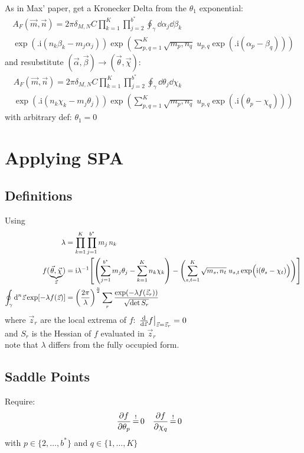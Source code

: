 \documentclass[
	english,
	a4paper,
	fontsize=10pt,
	parskip=half,
	titlepage=true,
	DIV=12,
	final
]{scrreprt}
\newcommand*{\iunit}{\ensuremath{\mathrm{i}}}
\newcommand*{\equalCond}{  \mathop{=}\limits^!  }
\begin{document}
As in Max' paper, get a Kronecker Delta from the $\theta_1$ exponential:
\begin{multline}	
	A_F(\vec{m}, \vec{n})
=
	2\pi \delta_{M,N} C
	\prod_{k=1}^{K}
	\prod_{j=2}^{b^*}
		\oint_{\gamma}
			\dd{\alpha_j} \dd{\beta_k}
\\
	\exp(
		\Big.
		\iunit(
		n_k \beta _k   -
		m_j \alpha_j
	))
	\exp(
		\sum_{p,q=1}^{K}
		\sqrt{m_p, n_q} \;
		u_{p,q}
		\exp(\Big.
			\iunit(\alpha_p - \beta_q)
		)
	)
\end{multline}
and resubstitute $(\vec{\alpha}, \vec{\beta}) \to (\vec{\theta}, \vec{\chi})$:
\begin{multline}	
	A_F(\vec{m}, \vec{n})
=
	2\pi \delta_{M,N} C
	\prod_{k=1}^{K}
	\prod_{j=2}^{b^*}
		\oint_{\gamma}
			\dd{\theta_j} \dd{\chi_k}
\\
	\exp(
		\Big.
		\iunit(
		n_k \chi  _k   -
		m_j \theta_j
	))
	\exp(
		\sum_{p,q=1}^{K}
		\sqrt{m_p, n_q} \;
		u_{p,q}
		\exp(\Big.
			\iunit(\theta_p - \chi_q)
		)
	)
\end{multline}
with arbitrary def: $\theta_1 = 0$

\section{Applying SPA}
\subsection{Definitions}
Using
\begin{align}
	\lambda
&=
	\prod_{k=1}^{K}
	\prod_{j=1}^{b^*}
		m_j \, n_k
\\
	f(
		\underbrace{ \vec{\theta}, \vec{\chi} }_{\vec{z}}
	)
&=
	\iunit
	\lambda^{-1}
	\qty[
		\qty(
			\sum_{j=1}^{b^*}
				m_j \theta_j   -
			\sum_{k=1}^{K}
				n_k \chi  _k
		)
	-
		\qty(
			\sum_{s,t=1}^{K}
			\sqrt{m_s, n_t} \;
			u_{s,t}
			\exp(\Big.
				\iunit(\theta_s - \chi_t)
			)
		)
	]
\\
	\oint_{\gamma} \dd[n]{\vec{z}}
		\exp[-\lambda f(\vec{z})]
&=
	\qty( \frac
		{2\pi}
		{\lambda}
	)^{\frac{n}{2}}
	\sum_{r}
		\frac
		{\exp(-\lambda f(\vec{z}_r))}
		{\sqrt{\det S_r}}
\end{align}
where $\vec{z}_r$ are the local extrema of $f$: $\eval{\dv{\vec{z}}f}_{\vec{z} = \vec{z}_r} = 0$\\
and $S_r$ is the Hessian of $f$ evaluated in $\vec{z}_r$\\
{\color{red} note that $\lambda$ differs from the fully occupied form.}

\subsection{Saddle Points}
\label{sec:saddles}
Require:
\begin{align}
	\pdv{f}{\theta_p} &\equalCond 0
&
	\pdv{f}{\chi  _q} &\equalCond 0 
\end{align}
with $p \in \{2, \ldots, b^*\}$ and $q \in \{1, \ldots, K\}$
\end{document}
